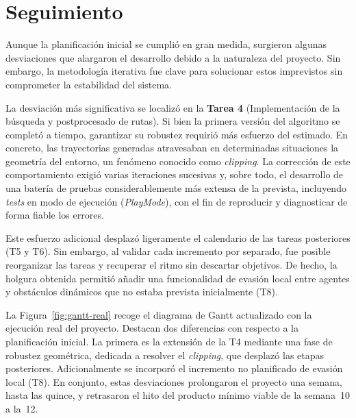 \section{Seguimiento}
\label{sec:seguimiento}

Aunque la planificación inicial se cumplió en gran medida, surgieron algunas desviaciones que alargaron el desarrollo debido a la naturaleza del proyecto.
Sin embargo, la metodología iterativa fue clave para solucionar estos imprevistos sin comprometer la estabilidad del sistema.

La desviación más significativa se localizó en la \textbf{Tarea 4} (Implementación de la búsqueda y postprocesado de rutas).
Si bien la primera versión del algoritmo se completó a tiempo, garantizar su robustez requirió más esfuerzo del estimado.
En concreto, las trayectorias generadas atravesaban en determinadas situaciones la geometría del entorno, un fenómeno conocido como \textit{clipping}.
La corrección de este comportamiento exigió varias iteraciones sucesivas y, sobre todo, el desarrollo de una batería de pruebas considerablemente más extensa de la prevista, incluyendo \textit{tests} en modo de ejecución (\textit{PlayMode}), con el fin de reproducir y diagnosticar de forma fiable los errores.

Este esfuerzo adicional desplazó ligeramente el calendario de las tareas posteriores (T5 y T6).
Sin embargo, al validar cada incremento por separado, fue posible reorganizar las tareas y recuperar el ritmo sin descartar objetivos.
De hecho, la holgura obtenida permitió añadir una funcionalidad de evasión local entre agentes y obstáculos dinámicos que no estaba prevista inicialmente (T8).

La Figura~\ref{fig:gantt-real} recoge el diagrama de Gantt actualizado con la ejecución real del proyecto.
Destacan dos diferencias con respecto a la planificación inicial.
La primera es la extensión de la T4 mediante una fase de robustez geométrica, dedicada a resolver el \textit{clipping}, que desplazó las etapas posteriores.
Adicionalmente se incorporó el incremento no planificado de evasión local (T8).
En conjunto, estas desviaciones prolongaron el proyecto una semana, hasta las quince, y retrasaron el hito del producto mínimo viable de la semana~10 a la~12.

